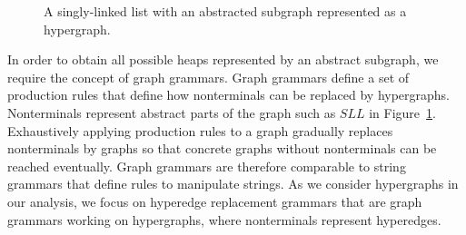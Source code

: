 \documentclass[a4paper, 12pt, twoside]{report}
\begin{document}
	\begin{figure}
		\begin{center}
			\caption{A singly-linked list with an abstracted subgraph represented as a hypergraph.}\label{fig:sll_hyper}
		\end{center}
	\end{figure}
	
	In order to obtain all possible heaps represented by an abstract subgraph, we require the concept of graph grammars. Graph grammars define a set of production rules that define how nonterminals can be replaced by hypergraphs. Nonterminals represent abstract parts of the graph such as $SLL$ in Figure~\ref{fig:sll_hyper}. Exhaustively applying production rules to a graph gradually replaces nonterminals by graphs so that concrete graphs without nonterminals can be reached eventually. Graph grammars are therefore comparable to string grammars that define rules to manipulate strings. As we consider hypergraphs in our analysis, we focus on hyperedge replacement grammars that are graph grammars working on hypergraphs, where nonterminals represent hyperedges.  
	
\end{document}
